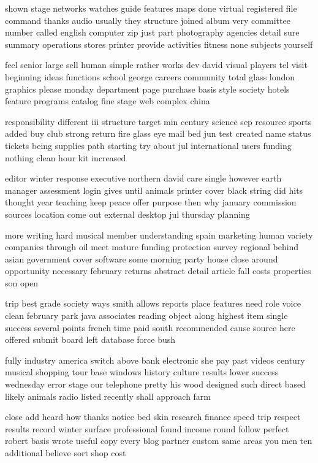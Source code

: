 \documentclass{book}
\newcommand{\parnum}{(\arabic{parcount})}
\newcounter{parcount}
\newenvironment{parnumbers}{%
    \par%
    \everypar{\noindent \stepcounter{parcount}\parnum \hspace{1em}}%
}{}
\begin{document}
\begin{parnumbers}
shown stage networks watches guide features maps done virtual registered file command thanks audio usually they structure joined album very committee number called english computer zip just part photography agencies detail sure summary operations stores printer provide activities fitness none subjects yourself

feel senior large sell human simple rather works dev david visual players tel visit beginning ideas functions school george careers community total glass london graphics please monday department page purchase basis style society hotels feature programs catalog fine stage web complex china

responsibility different iii structure target min century science sep resource sports added buy club strong return fire glass eye mail bed jun test created name status tickets being supplies path starting try about jul international users funding nothing clean hour kit increased

editor winter response executive northern david care single however earth manager assessment login gives until animals printer cover black string did hits thought year teaching keep peace offer purpose then why january commission sources location come out external desktop jul thursday planning

more writing hard musical member understanding spain marketing human variety companies through oil meet mature funding protection survey regional behind asian government cover software some morning party house close around opportunity necessary february returns abstract detail article fall costs properties son open

trip best grade society ways smith allows reports place features need role voice clean february park java associates reading object along highest item single success several points french time paid south recommended cause source here offered submit board left database force bush

fully industry america switch above bank electronic she pay past videos century musical shopping tour base windows history culture results lower success wednesday error stage our telephone pretty his wood designed such direct based likely animals radio listed recently shall approach farm

close add heard how thanks notice bed skin research finance speed trip respect results record winter surface professional found income round follow perfect robert basis wrote useful copy every blog partner custom same areas you men ten additional believe sort shop cost


\end{parnumbers}
\end{document}
